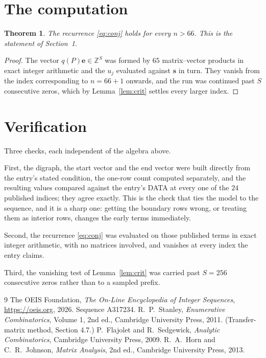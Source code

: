 \documentclass[11pt,a4paper]{article}
\theoremstyle{plain}
\newtheorem{theorem}{Theorem}
\theoremstyle{definition}
\begin{document}
\section{The computation}

\begin{theorem}
The recurrence \eqref{eq:conj} holds for every $n>66$. This is the statement of
Section~1.
\end{theorem}

\begin{proof}
The vector $q(P)\mathbf{e}\in\mathbb{Z}^{S}$ was formed by $65$ matrix--vector
products in exact integer arithmetic and the $u_j$ evaluated against $\mathbf{s}$ in turn.
They vanish from the index corresponding to $n=66+1$ onwards, and the run was continued
past $S$ consecutive zeros, which by Lemma~\ref{lem:crit} settles every larger index.
\end{proof}

\section{Verification}

Three checks, each independent of the algebra above.

First, the digraph, the start vector and the end vector were built directly from the
entry's stated condition, the one-row count computed separately, and the resulting values
compared against the entry's DATA at every one of the $24$ published indices; they
agree exactly. This is the check that ties the model to the sequence, and it is a sharp one:
getting the boundary rows wrong, or treating them as interior rows, changes the early terms
immediately.

Second, the recurrence \eqref{eq:conj} was evaluated on those published terms in exact
integer arithmetic, with no matrices involved, and vanishes at every index the entry claims.

Third, the vanishing test of Lemma~\ref{lem:crit} was carried past $S=256$ consecutive
zeros rather than to a sampled prefix.

\begin{thebibliography}{9}
 The OEIS Foundation, \emph{The On-Line Encyclopedia of Integer
Sequences}, \url{https://oeis.org}, 2026. Sequence A317234.
 R.~P.~Stanley, \emph{Enumerative Combinatorics}, Volume 1, 2nd ed.,
Cambridge University Press, 2011. (Transfer-matrix method, Section 4.7.)
 P.~Flajolet and R.~Sedgewick, \emph{Analytic Combinatorics}, Cambridge
University Press, 2009.
 R.~A.~Horn and C.~R.~Johnson, \emph{Matrix Analysis}, 2nd ed., Cambridge
University Press, 2013.
\end{thebibliography}
\end{document}
